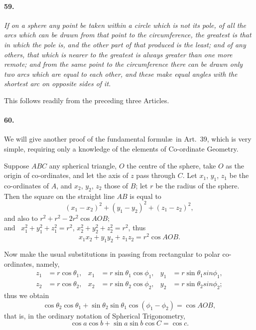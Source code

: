 \documentclass{book}[2004/02/16]
\begin{document}
\begin{mainmatter}
\begin{spacing}{1.3}
\paragraph{59.} \textit{If on a sphere any point be taken within a circle which
is not its pole, of all the arcs which can be drawn from that point
to the circumference, the greatest is that in which the pole is, and the
other part of that produced is the least; and of any others, that which
is nearer to the greatest is always greater than one more remote; and
from the same point to the circumference there can be drawn only
two arcs which are equal to each other, and these make equal angles
with the shortest arc on opposite sides of it.}

This follows readily from the preceding three Articles.

\paragraph{60.} We will give another proof of the fundamental formul\ae\
in Art.~39, which is very simple, requiring only a knowledge of
the elements of Co-ordinate Geometry.

Suppose $ABC$ any spherical triangle, $O$ the centre of the
sphere, take $O$ as the origin of co-ordinates, and let the axis of $z$
pass through $C$. Let $x_1$, $y_1$, $z_1$ be the co-ordinates of $A$, and $x_2$,
$y_2$, $z_2$ those of $B$; let $r$ be the radius of the sphere. Then the
square on the straight line $AB$ is equal to
\[
  (x_1 - x_2)^2 +
  (y_1 - y_2)^2 +
  (z_1 - z_2)^2,
\]
and also to \hfill $r^2 + r^2 - 2r^2 \cos AOB;$
\hfill\phantom{and also to}\\[1ex]
and \ $x_1^2 + y_1^2 + z_1^2 = r^2$, $x_2^2 + y_2^2 + z_2^2 = r^2$, thus
\[
x_1x_2 + y_1y_2 + z_1z_2 = r^2 \cos AOB.
\]

Now make the usual substitutions in passing from rectangular
to polar co-ordinates, namely,
\begin{align*}
z_1 &= r \cos \theta_1, &x_1 &= r \sin \theta_1 \cos \phi_1, &y_1 &= r \sin \theta_1 sin \phi_1, \\
z_2 &= r \cos \theta_2, &x_2 &= r \sin \theta_2 \cos \phi_2, &y_2 &= r \sin \theta_2 sin \phi_2;
\end{align*}
thus we obtain
\[
\cos \theta_2 \cos \theta_1 + \sin \theta_2 \sin \theta_1 \cos (\phi_1 - \phi_2) = \cos AOB,
\]
that is, in the ordinary notation of Spherical Trigonometry,
\[
\cos a \cos b + \sin a \sin b \cos C = \cos c.
\]


\end{spacing}
\end{mainmatter}
\end{document}
